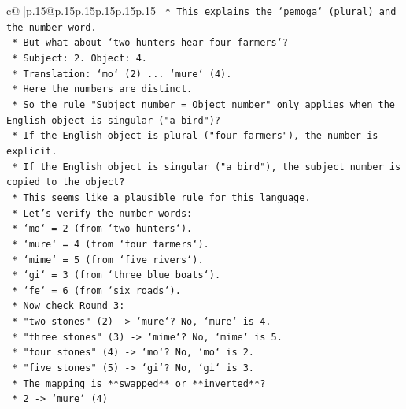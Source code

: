 \documentclass{article}
\begin{document}
{\begin{supertabular}{c@{$\;$}|p{.15\linewidth}@{}p{.15\linewidth}p{.15\linewidth}p{.15\linewidth}p{.15\linewidth}p{.15\linewidth}}
{{{\texttt{                *   This explains the `pemoga` (plural) and the number word.} \\
\texttt{                *   But what about `two hunters hear four farmers`?} \\
\texttt{                    *   Subject: 2. Object: 4.} \\
\texttt{                    *   Translation: `mo` (2) ... `mure` (4).} \\
\texttt{                    *   Here the numbers are distinct.} \\
\texttt{                    *   So the rule "Subject number = Object number" only applies when the English object is singular ("a bird")?} \\
\texttt{                    *   If the English object is plural ("four farmers"), the number is explicit.} \\
\texttt{                    *   If the English object is singular ("a bird"), the subject number is copied to the object?} \\
\texttt{                *   This seems like a plausible rule for this language.} \\
\texttt{                *   Let's verify the number words:} \\
\texttt{                    *   `mo` = 2 (from `two hunters`).} \\
\texttt{                    *   `mure` = 4 (from `four farmers`).} \\
\texttt{                    *   `mime` = 5 (from `five rivers`).} \\
\texttt{                    *   `gi` = 3 (from `three blue boats`).} \\
\texttt{                    *   `fe` = 6 (from `six roads`).} \\
\texttt{                *   Now check Round 3:} \\
\texttt{                    *   "two stones" (2) {-}> `mure`? No, `mure` is 4.} \\
\texttt{                    *   "three stones" (3) {-}> `mime`? No, `mime` is 5.} \\
\texttt{                    *   "four stones" (4) {-}> `mo`? No, `mo` is 2.} \\
\texttt{                    *   "five stones" (5) {-}> `gi`? No, `gi` is 3.} \\
\texttt{                *   The mapping is **swapped** or **inverted**?} \\
\texttt{                *   2 {-}> `mure` (4)} \\
}}}
\end{supertabular}}
\end{document}
